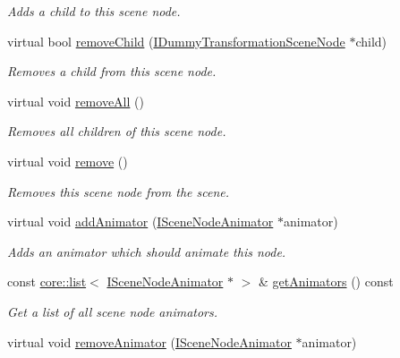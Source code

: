 \begin{DoxyCompactItemize}
\begin{DoxyCompactList}\small\item\em Adds a child to this scene node. \end{DoxyCompactList}\item 
virtual bool \hyperlink{classirr_1_1scene_1_1IDummyTransformationSceneNode_a0b0d33aefe1f93d278765f5eb74dc966}{remove\+Child} (\hyperlink{classirr_1_1scene_1_1IDummyTransformationSceneNode}{I\+Dummy\+Transformation\+Scene\+Node} $\ast$child)
\begin{DoxyCompactList}\small\item\em Removes a child from this scene node. \end{DoxyCompactList}\item 
virtual void \hyperlink{classirr_1_1scene_1_1IDummyTransformationSceneNode_a785adff20757a034167201bdfb13bbfa}{remove\+All} ()
\begin{DoxyCompactList}\small\item\em Removes all children of this scene node. \end{DoxyCompactList}\item 
virtual void \hyperlink{classirr_1_1scene_1_1IDummyTransformationSceneNode_a672cb748079172ee204bb389e1bde04d}{remove} ()
\begin{DoxyCompactList}\small\item\em Removes this scene node from the scene. \end{DoxyCompactList}\item 
virtual void \hyperlink{classirr_1_1scene_1_1IDummyTransformationSceneNode_ace62fd3a3a33bccfbed6fa958786bf9b}{add\+Animator} (\hyperlink{classirr_1_1scene_1_1ISceneNodeAnimator}{I\+Scene\+Node\+Animator} $\ast$animator)
\begin{DoxyCompactList}\small\item\em Adds an animator which should animate this node. \end{DoxyCompactList}\item 
const \hyperlink{classirr_1_1core_1_1list}{core\+::list}$<$ \hyperlink{classirr_1_1scene_1_1ISceneNodeAnimator}{I\+Scene\+Node\+Animator} $\ast$ $>$ \& \hyperlink{classirr_1_1scene_1_1IDummyTransformationSceneNode_a329082f8ec526ac1ba5bbc817b69326c}{get\+Animators} () const 
\begin{DoxyCompactList}\small\item\em Get a list of all scene node animators. \end{DoxyCompactList}\item 
virtual void \hyperlink{classirr_1_1scene_1_1IDummyTransformationSceneNode_a684d1d1066004a833be3ba83b4db5249}{remove\+Animator} (\hyperlink{classirr_1_1scene_1_1ISceneNodeAnimator}{I\+Scene\+Node\+Animator} $\ast$animator)

\end{DoxyCompactItemize}
